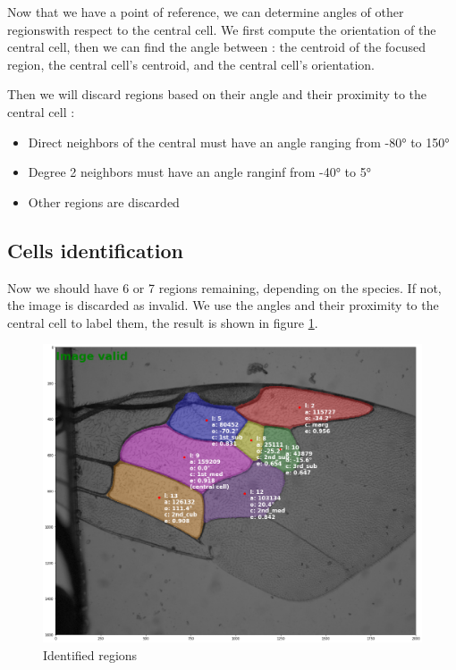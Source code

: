 \documentclass[a4paper]{article}
\begin{document}
Now that we have a point of reference, we can determine angles of other regionswith respect to the central cell. We first compute the orientation of the central cell, then we can find the angle between : the centroid of the focused region, the central cell's centroid, and the central cell's orientation. 

Then we will discard regions based on their angle and their proximity to the central cell :
\begin{itemize}
    \item Direct neighbors of the central must have an angle ranging from -80° to 150°
    \item Degree 2 neighbors must have an angle ranginf from -40° to 5°
    \item Other regions are discarded
\end{itemize}

\subsection{Cells identification}

Now we should have 6 or 7 regions remaining, depending on the species. If not, the image is discarded as invalid.
We use the angles and their proximity to the central cell to label them, the result is shown in figure \ref{identify}.

\begin{figure}[H]
    \centering
    \includegraphics[width=\textwidth]{figures/identify_regions.png}
    \caption{Identified regions}
    \label{identify}
\end{figure}
\end{document}
